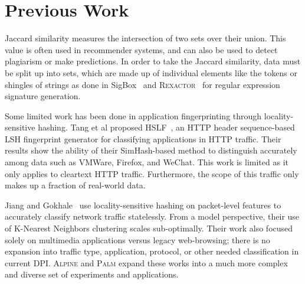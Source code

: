 \section{Previous Work}

Jaccard similarity measures the intersection of two sets over their union. This value is often used in recommender systems, and can also be used to detect plagiarism or make predictions. In order to take the Jaccard similarity, data must be split up into sets, which are made up of individual elements like the tokens or shingles of strings as done in SigBox~\cite{sigbox} and \textsc{Rexactor}~\cite{rexactor} for regular expression signature generation.

Some limited work has been done in application fingerprinting through locality-sensitive hashing. Tang et al proposed HSLF~\cite{hslf}, an HTTP header sequence-based LSH fingerprint generator for classifying applications in HTTP traffic. Their results show the ability of their SimHash-based method to distinguish accurately among data such as VMWare, Firefox, and WeChat. This work is limited as it only applies to cleartext HTTP traffic. Furthermore, the scope of this traffic only makes up a fraction of real-world data.


Jiang and Gokhale~\cite{fpga} use locality-sensitive hashing on packet-level features to accurately classify network traffic statelessly. From a model perspective, their use of K-Nearest Neighbors clustering scales sub-optimally. Their work also focused solely on multimedia applications versus legacy web-browsing; there is no expansion into traffic type, application, protocol, or other needed classification in current DPI. \textsc{Alpine} and \textsc{Palm} expand these works into a much more complex and diverse set of experiments and applications.
